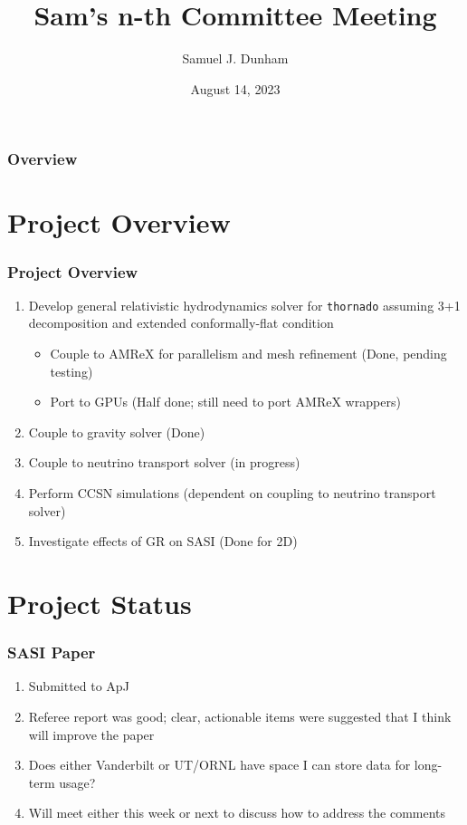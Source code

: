 \documentclass{beamer}
\title[Committee Meeting]{Sam's n-th Committee Meeting}
\author{Samuel J. Dunham}
\date{August 14, 2023}
\newcommand{\thornado}{\texttt{thornado}}
\newcommand{\amrex}{AMReX}
\begin{document}
\begin{frame}

  \titlepage

\end{frame}


\begin{frame}
\frametitle{Overview}
\tableofcontents
\end{frame}


\section{Project Overview}

\begin{frame}
\frametitle{Project Overview}

  \begin{enumerate}
    \item
      Develop general relativistic hydrodynamics solver for
      \thornado{} assuming 3+1 decomposition and
      extended conformally-flat condition
      \begin{itemize}
        \item
          Couple to \amrex{} for parallelism and mesh refinement
          (Done, pending testing)
        \item
          Port to GPUs (Half done; still need to port \amrex{} wrappers)
      \end{itemize}
    \item
      Couple to gravity solver (Done)
    \item
      Couple to neutrino transport solver (in progress)
    \item
      Perform CCSN simulations
      (dependent on coupling to neutrino transport solver)
    \item
      Investigate effects of GR on SASI (Done for 2D)
  \end{enumerate}

\end{frame}

\section{Project Status}

\begin{frame}
\frametitle{SASI Paper}

  \begin{enumerate}
    \item
      Submitted to ApJ
    \item
      Referee report was good; clear, actionable items were suggested
      that I think will improve the paper
    \item
      Does either Vanderbilt or UT/ORNL have space I can store data
      for long-term usage?
    \item
      Will meet either this week or next to discuss how to address
      the comments
  \end{enumerate}

\end{frame}
\end{document}
